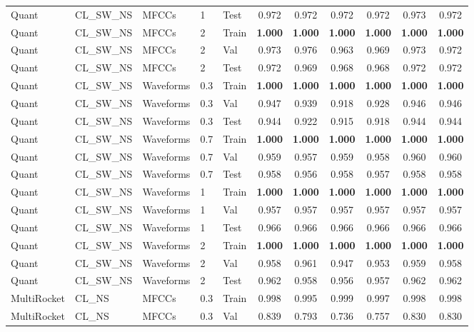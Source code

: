 \begin{landscape}
\begin{longtable}{|l|l|l|l|l|c|c|c|c|c|c|}
Quant & CL\_SW\_NS & MFCCs & 1 & Test & 0.972 & 0.972 & 0.972 & 0.972 & 0.973 & 0.972 \\
Quant & CL\_SW\_NS & MFCCs & 2 & Train & \textbf{1.000} & \textbf{1.000} & \textbf{1.000} & \textbf{1.000} & \textbf{1.000} & \textbf{1.000} \\
Quant & CL\_SW\_NS & MFCCs & 2 & Val & 0.973 & 0.976 & 0.963 & 0.969 & 0.973 & 0.972 \\
Quant & CL\_SW\_NS & MFCCs & 2 & Test & 0.972 & 0.969 & 0.968 & 0.968 & 0.972 & 0.972 \\
Quant & CL\_SW\_NS & Waveforms & 0.3 & Train & \textbf{1.000} & \textbf{1.000} & \textbf{1.000} & \textbf{1.000} & \textbf{1.000} & \textbf{1.000} \\
Quant & CL\_SW\_NS & Waveforms & 0.3 & Val & 0.947 & 0.939 & 0.918 & 0.928 & 0.946 & 0.946 \\
Quant & CL\_SW\_NS & Waveforms & 0.3 & Test & 0.944 & 0.922 & 0.915 & 0.918 & 0.944 & 0.944 \\
Quant & CL\_SW\_NS & Waveforms & 0.7 & Train & \textbf{1.000} & \textbf{1.000} & \textbf{1.000} & \textbf{1.000} & \textbf{1.000} & \textbf{1.000} \\
Quant & CL\_SW\_NS & Waveforms & 0.7 & Val & 0.959 & 0.957 & 0.959 & 0.958 & 0.960 & 0.960 \\
Quant & CL\_SW\_NS & Waveforms & 0.7 & Test & 0.958 & 0.956 & 0.958 & 0.957 & 0.958 & 0.958 \\
Quant & CL\_SW\_NS & Waveforms & 1 & Train & \textbf{1.000} & \textbf{1.000} & \textbf{1.000} & \textbf{1.000} & \textbf{1.000} & \textbf{1.000} \\
Quant & CL\_SW\_NS & Waveforms & 1 & Val & 0.957 & 0.957 & 0.957 & 0.957 & 0.957 & 0.957 \\
Quant & CL\_SW\_NS & Waveforms & 1 & Test & 0.966 & 0.966 & 0.966 & 0.966 & 0.966 & 0.966 \\
Quant & CL\_SW\_NS & Waveforms & 2 & Train & \textbf{1.000} & \textbf{1.000} & \textbf{1.000} & \textbf{1.000} & \textbf{1.000} & \textbf{1.000} \\
Quant & CL\_SW\_NS & Waveforms & 2 & Val & 0.958 & 0.961 & 0.947 & 0.953 & 0.959 & 0.958 \\
Quant & CL\_SW\_NS & Waveforms & 2 & Test & 0.962 & 0.958 & 0.956 & 0.957 & 0.962 & 0.962 \\
MultiRocket & CL\_NS & MFCCs & 0.3 & Train & 0.998 & 0.995 & 0.999 & 0.997 & 0.998 & 0.998 \\
MultiRocket & CL\_NS & MFCCs & 0.3 & Val & 0.839 & 0.793 & 0.736 & 0.757 & 0.830 & 0.830 \\

\end{longtable}
\end{landscape}
